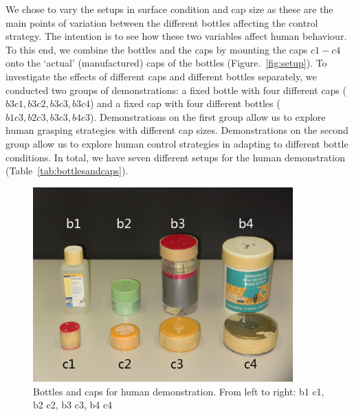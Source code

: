 We chose to vary the setups in surface condition and cap size as these
are the main points of variation between the different bottles
affecting the control strategy. The intention is to see how these two
variables affect human behaviour. To this end, we combine the bottles
and the caps by mounting the caps $c1-c4$ onto the `actual'
(manufactured) caps of the bottles (Figure.~\ref{fig:setup}). To
investigate the effects of different caps and different bottles
separately, we conducted two groups of demonstrations: a fixed bottle with
four different caps ($b3c1, b3c2, b3c3, b3c4$) and a fixed cap with four
different bottles ($b1c3, b2c3, b3c3, b4c3$). Demonstrations on the
first group allow us to explore human grasping strategies with
different cap sizes. Demonstrations on the second group allow us to
explore human control strategies in adapting to different bottle
conditions. In total, we have seven different setups for the human
demonstration (Table~\ref{tab:bottlesandcaps}).


\begin{figure}
  \centering
  \includegraphics[width=10cm]{./fig_cha4/b_c.jpg}
  \caption{ \scriptsize{Bottles and caps for human demonstration. From left to right: b1 c1, b2 c2, b3 c3, b4  c4}
}
\label{fig:b_c}
\end{figure}






